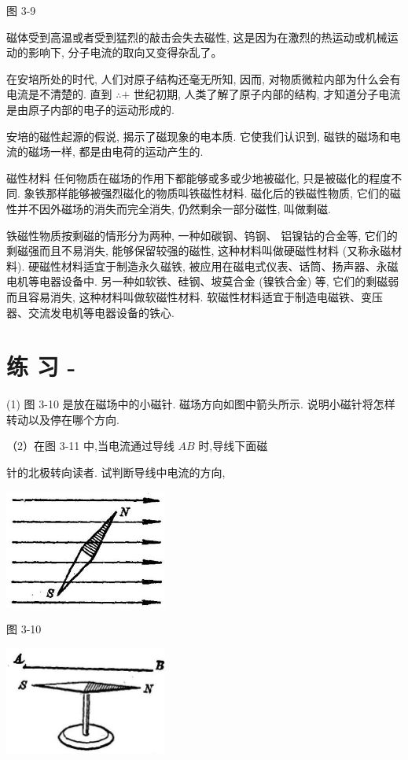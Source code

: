 \documentclass[10pt]{article}
\begin{document}
图 3-9

磁体受到高温或者受到猛烈的敲击会失去磁性, 这是因为在激烈的热运动或机械运动的影响下, 分子电流的取向又变得杂乱了。

在安培所处的时代, 人们对原子结构还毫无所知, 因而, 对物质微粒内部为什么会有电流是不清楚的. 直到 \(\therefore +\) 世纪初期, 人类了解了原子内部的结构, 才知道分子电流是由原子内部的电子的运动形成的.

安培的磁性起源的假说, 揭示了磁现象的电本质. 它使我们认识到, 磁铁的磁场和电流的磁场一样, 都是由电荷的运动产生的.

磁性材料 任何物质在磁场的作用下都能够或多或少地被磁化, 只是被磁化的程度不同. 象铁那样能够被强烈磁化的物质叫铁磁性材料. 磁化后的铁磁性物质, 它们的磁性并不因外磁场的消失而完全消失, 仍然剩余一部分磁性, 叫做剩磁.

铁磁性物质按剩磁的情形分为两种, 一种如碳钢、钨钢、 铝镍钴的合金等, 它们的剩磁强而且不易消失, 能够保留较强的磁性, 这种材料叫做硬磁性材料 (又称永磁材料). 硬磁性材料适宜于制造永久磁铁, 被应用在磁电式仪表、话筒、扬声器、永磁电机等电器设备中. 另一种如软铁、硅钢、坡莫合金 (镍铁合金) 等, 它们的剩磁弱而且容易消失, 这种材料叫做软磁性材料. 软磁性材料适宜于制造电磁铁、变压器、交流发电机等电器设备的铁心.

\section*{练 习 -}

(1) 图 3-10 是放在磁场中的小磁针. 磁场方向如图中箭头所示. 说明小磁针将怎样转动以及停在哪个方向.

（2）在图 3-11 中,当电流通过导线 \({AB}\) 时,导线下面磁

针的北极转向读者. 试判断导线中电流的方向,

\begin{center}
\includegraphics[max width=0.4\textwidth]{images/01913056-1f15-74d8-9184-9aab52c9d66b_109_349211.jpg}
\end{center}

图 3-10

\begin{center}
\includegraphics[max width=0.4\textwidth]{images/01913056-1f15-74d8-9184-9aab52c9d66b_109_618529.jpg}
\end{center}
\end{document}
